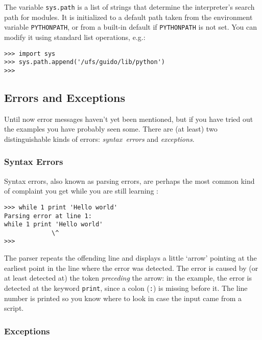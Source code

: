The variable
{\tt sys.path}
is a list of strings that determine the interpreter's search path for
modules.
It is initialized to a default path taken from the environment variable
{\tt PYTHONPATH},
or from a built-in default if
{\tt PYTHONPATH}
is not set.
You can modify it using standard list operations, e.g.:
\begin{code}\begin{verbatim}
>>> import sys
>>> sys.path.append('/ufs/guido/lib/python')
>>> 
\end{verbatim}\end{code}

\subsection{Errors and Exceptions}

Until now error messages haven't yet been mentioned, but if you have
tried out the examples you have probably seen some.
There are (at least) two distinguishable kinds of errors:
{\it syntax\ errors}
and
{\it exceptions}.

\subsubsection{Syntax Errors}

Syntax errors, also known as parsing errors, are perhaps the most common
kind of complaint you get while you are still learning \Python:
\begin{code}\begin{verbatim}
>>> while 1 print 'Hello world'
Parsing error at line 1:
while 1 print 'Hello world'
             \^
>>> 
\end{verbatim}\end{code}
The parser repeats the offending line and displays a little `arrow'
pointing at the earliest point in the line where the error was detected.
The error is caused by (or at least detected at) the token
{\it preceding}
the arrow: in the example, the error is detected at the keyword
{\tt print}, since a colon ({\tt :}) is missing before it.
The line number is printed so you know where to look in case the input
came from a script.

\subsubsection{Exceptions}


